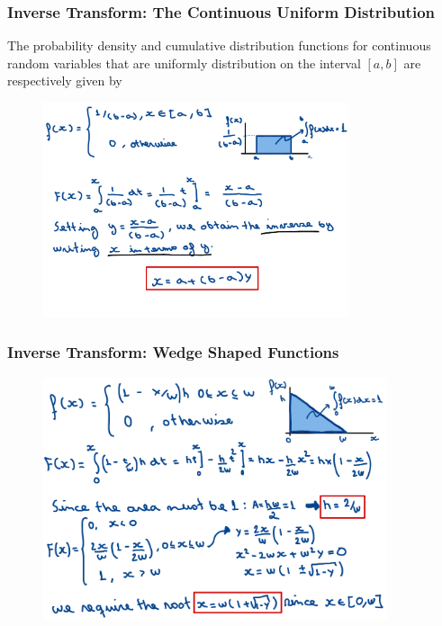 \begin{frame}
    \frametitle{Inverse Transform: The Continuous Uniform Distribution}
    The probability density and cumulative distribution functions for continuous random variables that
    are uniformly distribution on the interval $[a,b]$ are respectively given by
    \begin{figure}
        \centering
        \includegraphics[width=0.8\textwidth]{sections/prng/figures/uniform_dist_example.pdf}
    \end{figure}
\end{frame}



\begin{frame}
    \frametitle{Inverse Transform: Wedge Shaped Functions}
    
    \begin{figure}
        \centering
        \includegraphics[width=0.9\textwidth]{sections/prng/figures/wedge_shaped_example.pdf}
    \end{figure}
\end{frame}


